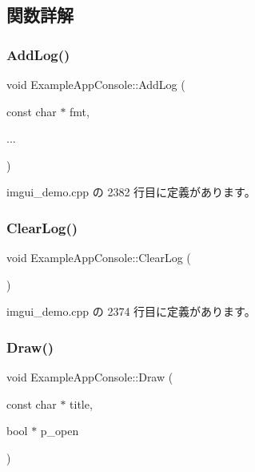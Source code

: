 \subsection{関数詳解}
\mbox{\label{struct_example_app_console_a719354ce6be7481923a5fd702e785952}} 
\subsubsection{\texorpdfstring{Add\+Log()}{AddLog()}}
{\footnotesize\ttfamily void Example\+App\+Console\+::\+Add\+Log (\begin{DoxyParamCaption}\item[{const char $\ast$}]{fmt,  }\item[{}]{... }\end{DoxyParamCaption})\hspace{0.3cm}{\ttfamily [inline]}}



 imgui\+\_\+demo.\+cpp の 2382 行目に定義があります。

\mbox{\label{struct_example_app_console_a2ef13f00c474b16b8da2ec062d5e5cc2}} 
\subsubsection{\texorpdfstring{Clear\+Log()}{ClearLog()}}
{\footnotesize\ttfamily void Example\+App\+Console\+::\+Clear\+Log (\begin{DoxyParamCaption}{ }\end{DoxyParamCaption})\hspace{0.3cm}{\ttfamily [inline]}}



 imgui\+\_\+demo.\+cpp の 2374 行目に定義があります。

\mbox{\label{struct_example_app_console_a0518a09c7e8648dd52c7c06df19ac17a}} 
\subsubsection{\texorpdfstring{Draw()}{Draw()}}
{\footnotesize\ttfamily void Example\+App\+Console\+::\+Draw (\begin{DoxyParamCaption}\item[{const char $\ast$}]{title,  }\item[{bool $\ast$}]{p\+\_\+open }\end{DoxyParamCaption})\hspace{0.3cm}{\ttfamily [inline]}}




